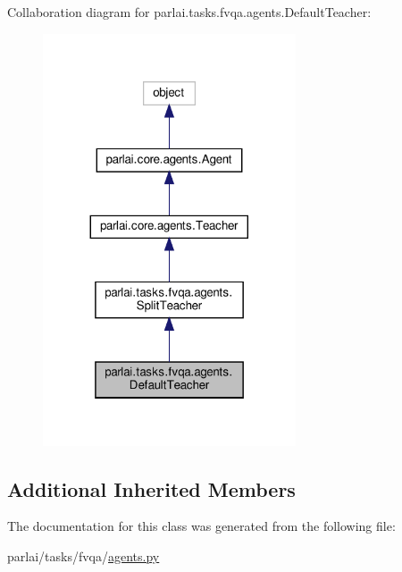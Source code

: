 Collaboration diagram for parlai.\+tasks.\+fvqa.\+agents.\+Default\+Teacher\+:
\nopagebreak
\begin{figure}[H]
\begin{center}
\leavevmode
\includegraphics[width=212pt]{classparlai_1_1tasks_1_1fvqa_1_1agents_1_1DefaultTeacher__coll__graph}
\end{center}
\end{figure}
\subsection*{Additional Inherited Members}


The documentation for this class was generated from the following file\+:\begin{DoxyCompactItemize}
\item 
parlai/tasks/fvqa/\hyperlink{parlai_2tasks_2fvqa_2agents_8py}{agents.\+py}\end{DoxyCompactItemize}
